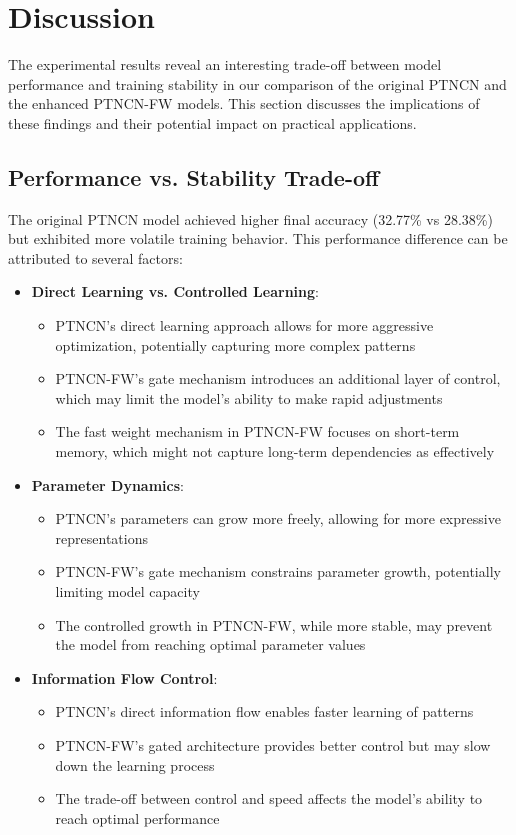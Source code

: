 \documentclass{article}
\begin{document}
\section{Discussion}

The experimental results reveal an interesting trade-off between model performance and training stability in our comparison of the original PTNCN and the enhanced PTNCN-FW models. This section discusses the implications of these findings and their potential impact on practical applications.

\subsection{Performance vs. Stability Trade-off}

The original PTNCN model achieved higher final accuracy (32.77\% vs 28.38\%) but exhibited more volatile training behavior. This performance difference can be attributed to several factors:

\begin{itemize}
    \item \textbf{Direct Learning vs. Controlled Learning}:
    \begin{itemize}
        \item PTNCN's direct learning approach allows for more aggressive optimization, potentially capturing more complex patterns
        \item PTNCN-FW's gate mechanism introduces an additional layer of control, which may limit the model's ability to make rapid adjustments
        \item The fast weight mechanism in PTNCN-FW focuses on short-term memory, which might not capture long-term dependencies as effectively
    \end{itemize}

    \item \textbf{Parameter Dynamics}:
    \begin{itemize}
        \item PTNCN's parameters can grow more freely, allowing for more expressive representations
        \item PTNCN-FW's gate mechanism constrains parameter growth, potentially limiting model capacity
        \item The controlled growth in PTNCN-FW, while more stable, may prevent the model from reaching optimal parameter values
    \end{itemize}

    \item \textbf{Information Flow Control}:
    \begin{itemize}
        \item PTNCN's direct information flow enables faster learning of patterns
        \item PTNCN-FW's gated architecture provides better control but may slow down the learning process
        \item The trade-off between control and speed affects the model's ability to reach optimal performance
    \end{itemize}
\end{itemize}
\end{document}
